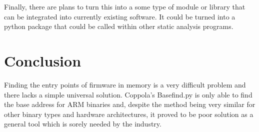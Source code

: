 \documentclass[letterpaper,twocolumn,10pt]{article}
\begin{document}
Finally, there are plans to turn this into a some type of module or library that can be integrated into currently existing software. It could be turned into a python package that could be called within other static analysis programs. 

\section{Conclusion}
Finding the entry points of firmware in memory is a very difficult problem and there lacks a simple universal solution. Coppola's Basefind.py is only able to find the base address for ARM binaries and, despite the method being very similar for other binary types and hardware architectures, it proved to be poor solution as a general tool which is sorely needed by the industry.



\end{document}

